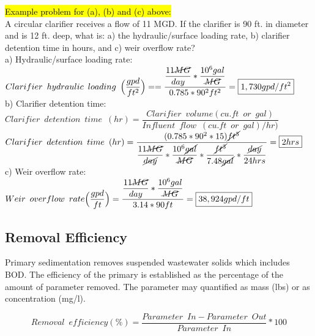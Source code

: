 \hl{Example problem for (a), (b) and (c) above:}\\
		\vspace{0.2cm}
A circular clarifier receives a flow of 11 MGD.  If the clarifier is 90 ft. in diameter and is 12 ft. deep, what is: a) the hydraulic/surface loading rate, b) clarifier detention time in hours, and c) weir overflow rate?\\
		\vspace{0.2cm}
a) Hydraulic/surface loading rate:\\
$Clarifier \enspace hydraulic \enspace loading \enspace 	\Big(\dfrac{gpd}{ft^2}\Big) ==\dfrac{\dfrac{11\cancel{MG}}{{day}}*\dfrac{10^6gal}{\cancel{MG}}}{0.785*90^2 ft^2}=\boxed{1,730gpd/ft^2}$\\
		\vspace{0.5cm}
b) Clarifier detention time:\\
$Clarifier \enspace detention \enspace time \enspace (hr) = 	\dfrac{ Clarifier \enspace volume (cu.ft \enspace or \enspace gal)}{Influent \enspace flow \enspace (cu.ft \enspace or \enspace gal)/hr)}$\\
		\vspace{0.2cm}
$Clarifier \enspace detention \enspace time \enspace (hr) = 	\dfrac{(0.785*90^2*15)\cancel{ft^3}}{\dfrac{11\cancel{MG}}{\cancel{day}}*\dfrac{10^6\cancel{gal}}{\cancel{MG}}*\dfrac{\cancel{ft^3}}{7.48\cancel{gal}}*\dfrac{\cancel{day}}{24hrs}}=\boxed{2hrs}$\\
		\vspace{0.5cm}
c) Weir overflow rate:\\
		\vspace{0.2cm} 
$Weir \enspace overflow \enspace rate \Big(\dfrac{gpd}{ft}\Big) =\dfrac{\dfrac{11\cancel{MG}}{{day}}*\dfrac{10^6gal}{\cancel{MG}}}{3.14*90 ft}=\boxed{38,924gpd/ft}$\\

\subsection{Removal Efficiency}		
Primary sedimentation removes suspended wastewater solids which includes BOD.  The efficiency of the primary is established as the percentage of the amount of parameter removed.  The parameter may quantified as mass (lbs) or as concentration (mg/l).

$$Removal \enspace efficiency (\%) = \dfrac{Parameter  \enspace In - Parameter  \enspace Out}{Parameter \enspace In} * 100$$

